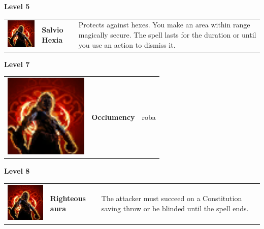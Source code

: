 \textbf{Level 5} 
\begin{tabular}{ m{4cm}m{3cm}m{6cm} } 
	\includegraphics[width=4cm]{../Pictures/Gameplay/Spells/Icon/spell_icon.png} & \textbf{Salvio Hexia} &  Protects against hexes. You make an area within range magically secure. The spell lasts for the duration or until you use an action to dismiss it.\\ 
\end{tabular}
\textbf{Level 7} 
\begin{tabular}{ m{4cm}m{3cm}m{6cm} } 
	\includegraphics[width=4cm]{../Pictures/Gameplay/Spells/Icon/spell_icon.png} & \textbf{Occlumency} & roba \\ %
\end{tabular}
\textbf{Level 8} 
\begin{tabular}{ m{4cm}m{3cm}m{6cm} } 
	\includegraphics[width=4cm]{../Pictures/Gameplay/Spells/Icon/spell_icon.png} & \textbf{Righteous aura} &  The attacker must succeed on a Constitution saving throw or be blinded until the spell ends. \\ %
\end{tabular}

\pagebreak













